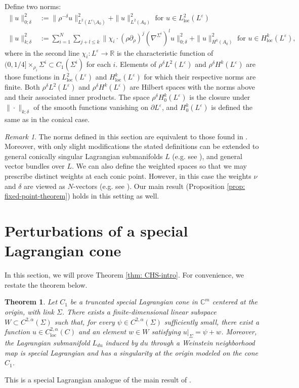 \documentclass[11pt]{amsart}
\newtheorem{theorem}{Theorem}
\theoremstyle{definition}
\theoremstyle{remark}
\newtheorem{remark}{Remark}
\newcommand{\C}{\mathbb{C}}
\newcommand{\R}{\mathbb{R}}
\begin{document}
Define two norms:
\begin{align*}
    \|u\|_{0;\delta}^2 &:= \|\rho^{-\delta}u \|_{L^2(L^\varepsilon \setminus A_0)}^2 + \|u\|_{L^2(A_0)}^2 \text{ for } u \in L_{\text{loc}}^2(L^\varepsilon) \\
    \|u\|_{k;\delta}^2 &:= \sum_{i = 1}^N\sum_{j + l \leq k}\|\chi_{i} \cdot (\rho \partial_\rho)^{j}(\nabla^{\Sigma^i})^l u\|_{0;\delta}^2 + \|u\|_{H^k(A_0)}^2 \text{ for } u \in H_{\text{loc}}^k(L^\varepsilon),
\end{align*}
where in the second line $\chi_{i} : L^\varepsilon \rightarrow \R$ is the characteristic function of $(0,1/4] \times_{\rho_i} \Sigma^i \subset C_1(\Sigma^i)$ for each $i$. Elements of $\rho^\delta L^2(L^\varepsilon)$ and $\rho^\delta H^k(L^\varepsilon)$ are those functions in $L_{\text{loc}}^2(L^\varepsilon)$ and $H_{\text{loc}}^k(L^\varepsilon)$ for which their respective norms are finite. Both $\rho^\delta L^2(L^\varepsilon)$ and $\rho^\delta H^k(L^\varepsilon)$ are Hilbert spaces with the norms above and their associated inner products. The space $\rho^\delta H_0^k(L^\varepsilon)$ is the closure under $\|\cdot\|_{k;\delta}$ of the smooth functions vanishing on $\partial L^\varepsilon$, and $H_0^k(L^\varepsilon)$ is defined the same as in the conical case. 
\begin{remark}
    The norms defined in this section are equivalent to those found in \cite{Sm89, Dim25}. Moreover, with only slight modifications the stated definitions can be extended to general conically singular Lagrangian submanifolds $L$ (e.g. see \cite{Sm93}), and general vector bundles over $L$. We can also define the weighted spaces so that we may prescribe distinct weights at each conic point. However, in this case the weights $\nu$ and $\delta$ are viewed as $N$-vectors (e.g. see \cite{Sm89, Sm93}). Our main result (Proposition \ref{prop: fixed-point-theorem}) holds in this setting as well.
\end{remark}

\section{Perturbations of a special Lagrangian cone}
In this section, we will prove Theorem \ref{thm: CHS-intro}. For convenience, we restate the theorem below.
\begin{theorem}\label{thm: SL-CHS}
    Let $C_1$ be a truncated special Lagrangian cone in $\C^m$ centered at the origin, with link $\Sigma$.
There exists a
finite-dimensional linear subspace
$W\subset C^{2,\alpha}(\Sigma)$
such that, for every $\psi\in C^{2,\alpha}(\Sigma)$ sufficiently small,
there exist a function
$u\in C^{2,\alpha}_{\mathrm{loc}}(C)$
and an element $w\in W$ satisfying
$u|_\Sigma=\psi+w$. Moreover, the Lagrangian submanifold $L_{du}$ induced by $du$ through a Weinstein neighborhood map is special Lagrangian and has a singularity at the origin modeled on the cone $C_1$.
\end{theorem}
This is a special Lagrangian analogue of the main result of
\cite{CHS}. \\
\end{document}
